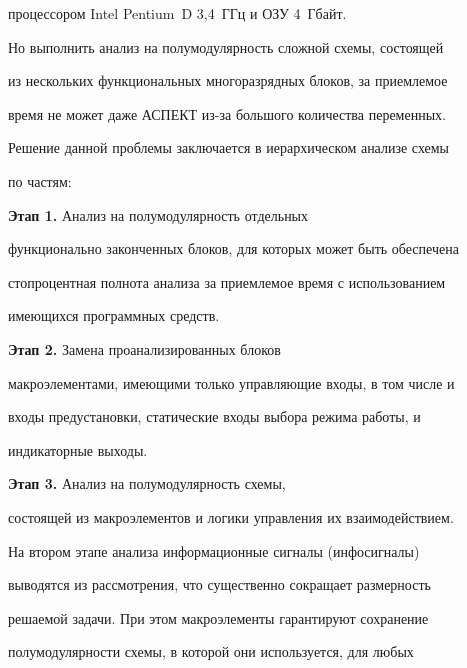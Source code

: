 процессором \mbox{Intel} Pentium~D 3,4~ГГц и ОЗУ 4~Гбайт.





   Но выполнить анализ на полумодулярность сложной схемы, состоящей


из нескольких функциональных многоразрядных блоков, за приемлемое


время не может даже АСПЕКТ из-за большого количества переменных.


Решение данной проблемы заключается в иерархическом анализе схемы


по частям:


\begin{description}


   \item \textbf{Этап 1.} Анализ на полумодулярность отдельных


функционально законченных блоков, для которых может быть обеспечена


стопроцентная полнота анализа за приемлемое вре\-мя с использованием


имеющихся программных средств.


   \item \textbf{Этап 2.} Замена проанализированных блоков


макроэлементами, имеющими только управляющие входы, в том числе и


входы предустановки, статические входы выбора режима работы, и


индикаторные выходы.


   \item \textbf{Этап 3.} Анализ на полумодулярность схемы,


состоящей из макроэлементов и логики управления их взаимодействием.


\end{description}





\smallskip





   На втором этапе анализа информационные сигналы (инфосигналы)


выводятся из рассмотрения, что существенно сокращает размерность


решаемой задачи. При этом макроэлементы гарантируют сохранение


полумодулярности схемы, в которой они используется, для любых


